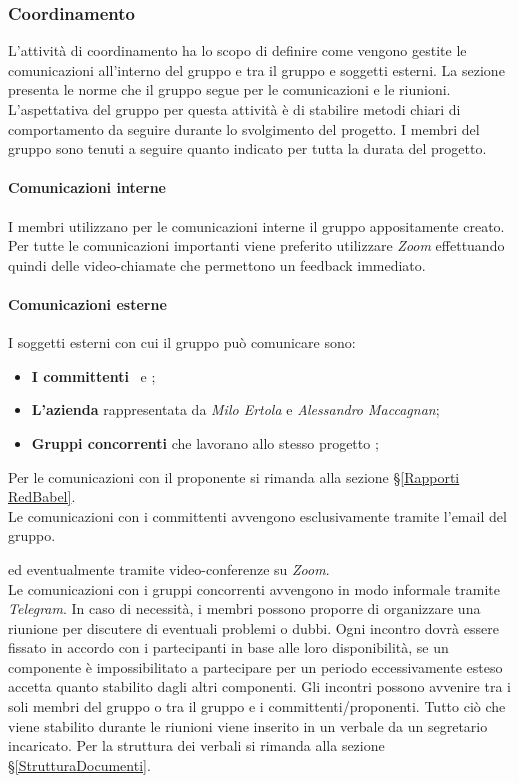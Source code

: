 \subsubsection{Coordinamento}
\label{PO_Coordinamento_Scopo}L'attività di coordinamento ha lo scopo di definire come vengono gestite le comunicazioni all'interno del gruppo {\Gruppo} e tra il gruppo e soggetti esterni.
La sezione presenta le norme che il gruppo segue per le comunicazioni e le riunioni.
L'aspettativa del gruppo per questa attività è di stabilire metodi chiari di comportamento da seguire durante lo svolgimento del progetto.
I membri del gruppo sono tenuti a seguire quanto indicato per tutta la durata del progetto.
\paragraph*{Comunicazioni interne}
I membri utilizzano per le comunicazioni interne il gruppo  appositamente creato. Per tutte le comunicazioni importanti viene preferito utilizzare \textit{Zoom} effettuando quindi delle video-chiamate che permettono un feedback immediato.
\paragraph*{Comunicazioni esterne}
I soggetti esterni con cui il gruppo può comunicare sono: 
\begin{itemize}
	\item \textbf{I committenti} \VT\ e \CR;
	\item \textbf{L'azienda \Proponente} rappresentata da \textit{Milo Ertola} e \textit{Alessandro Maccagnan};
	\item \textbf{Gruppi concorrenti} che lavorano allo stesso progetto \NomeProgetto;
\end{itemize}
Per le comunicazioni con il proponente si rimanda alla sezione \S\ref{Rapporti RedBabel}.\\
Le comunicazioni con i committenti avvengono esclusivamente tramite l'email del gruppo.
\begin{center}
	 \textbf{\Mail} 
\end{center} ed eventualmente tramite video-conferenze su \textit{Zoom}.\\
Le comunicazioni con i gruppi concorrenti avvengono in modo informale tramite \textit{Telegram}.
In caso di necessità, i membri possono proporre di organizzare una riunione per discutere di eventuali problemi o dubbi. Ogni incontro dovrà essere fissato in accordo con i partecipanti in base alle loro disponibilità, se un componente è impossibilitato a partecipare per un periodo eccessivamente esteso accetta quanto stabilito dagli altri componenti. Gli incontri possono avvenire tra i soli membri del gruppo o tra il gruppo e i committenti/proponenti. 
Tutto ciò che viene stabilito durante le riunioni viene inserito in un verbale da un segretario incaricato. Per la struttura dei verbali si rimanda alla sezione \S\ref{StrutturaDocumenti}.
